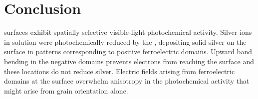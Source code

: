 \section{Conclusion}\label{sec:ch7conclusion}

 surfaces exhibit spatially selective visible-light photochemical activity.
Silver ions in solution were photochemically reduced by the , depositing solid
silver on the surface in patterns corresponding to positive ferroelectric domains. Upward
band bending in the negative domains prevents electrons from reaching the surface and
these locations do not reduce silver. Electric fields arising from ferroelectric domains
at the surface overwhelm anisotropy in the photochemical activity that might arise from
grain orientation alone.
